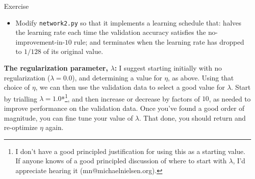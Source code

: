 \begin{exerciseBox}{Exercise}


\begin{itemize}

\item Modify \texttt{network2.py} so that it implements a learning schedule that: halves the learning rate each time the validation accuracy satisfies the no-improvement-in-$10$ rule; and terminates when the learning rate has dropped to $1/128$ of its original value.

\end{itemize}


\textbf{The regularization parameter, $\lambda$:} I suggest starting initially with no regularization ($\lambda = 0.0$), and determining a value for $\eta$, as above. Using that choice of $\eta$, we can then use the validation data to select a good value for $\lambda$. Start by trialling $\lambda = 1.0$*\footnote{I don't have a good principled justification for using this as a starting value. If anyone knows of a good principled discussion of where to start with $\lambda$, I'd appreciate hearing it (mn@michaelnielsen.org).}, and then increase or decrease by factors of $10$, as needed to improve performance on the validation data. Once you've found a good order of magnitude, you can fine tune your value of $\lambda$. That done, you should return and re-optimize $\eta$ again.

\end{exerciseBox}



